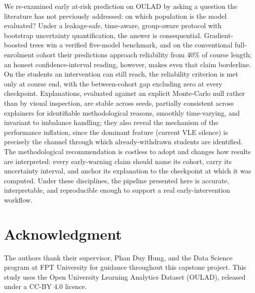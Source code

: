 \documentclass[conference]{IEEEtran}
\begin{document}
We re-examined early at-risk prediction on OULAD by asking a question the
literature has not previously addressed: on which population is the model
evaluated? Under a leakage-safe, time-aware, group-aware protocol with
bootstrap uncertainty quantification, the answer is consequential.
Gradient-boosted trees win a verified five-model benchmark, and on the
conventional full-enrolment cohort their predictions approach reliability
from 40\% of course length; an honest confidence-interval reading, however,
makes even that claim borderline. On the students an intervention can still
reach, the reliability criterion is met only at course end, with the
between-cohort gap excluding zero at every checkpoint. Explanations,
evaluated against an explicit Monte-Carlo null rather than by visual
inspection, are stable across seeds, partially consistent across explainers
for identifiable methodological reasons, smoothly time-varying, and
invariant to imbalance handling; they also reveal the mechanism of the
performance inflation, since the dominant feature (current VLE silence) is
precisely the channel through which already-withdrawn students are
identified. The methodological recommendation is costless to adopt and
changes how results are interpreted: every early-warning claim should name
its cohort, carry its uncertainty interval, and anchor its explanation to
the checkpoint at which it was computed. Under these disciplines, the
pipeline presented here is accurate, interpretable, and reproducible enough
to support a real early-intervention workflow.

\section*{Acknowledgment}
The authors thank their supervisor, Phan Duy Hung, and the Data
Science program at FPT University for guidance throughout this capstone
project. This study uses the Open University Learning Analytics Dataset
(OULAD), released under a CC-BY 4.0 licence.
\end{document}
